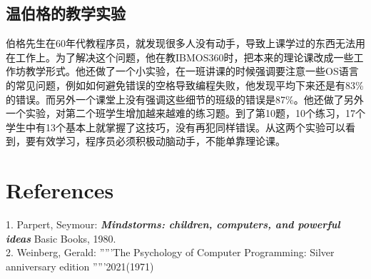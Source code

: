 \hypertarget{a2ux6e29ux4f2fux683cux7684ux6559ux5b66ux5b9eux9a8c}{%
\subsection{温伯格的教学实验}\label{a2ux6e29ux4f2fux683cux7684ux6559ux5b66ux5b9eux9a8c}}

伯格先生在60年代教程序员，就发现很多人没有动手，导致上课学过的东西无法用在工作上。为了解决这个问题，他在教IBMOS360时，把本来的理论课改成一些工作坊教学形式。他还做了一个小实验，在一班讲课的时候强调要注意一些OS语言的常见问题，例如如何避免错误的空格导致编程失败，他发现平均下来还是有83\%的错误。而另外一个课堂上没有强调这些细节的班级的错误是87\%。他还做了另外一个实验，对第二个班学生增加越来越难的练习题。到了第10题，10个练习，17个学生中有13个基本上就掌握了这技巧，没有再犯同样错误。从这两个实验可以看到，要有效学习，程序员必须积极动脑动手，不能单靠理论课。

\hypertarget{references}{%
\section{References}\label{references}}

1. Parpert, Seymour: \textbf{\emph{Mindstorms: children, computers, and
powerful ideas}} Basic Books, 1980.\\
2. Weinberg, Gerald: '''''The Psychology of Computer Programming: Silver
anniversary edition '''''2021(1971)\\




